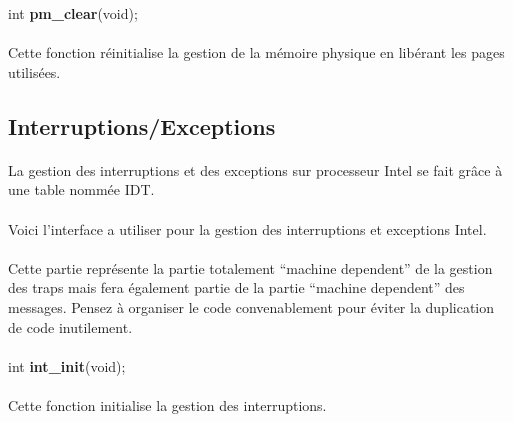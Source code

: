 \documentclass[10pt,a4wide]{article}
\begin{document}
\hspace{1.5cm}int \textbf{pm\_clear}(void);

\paragraph{}

Cette fonction r\'einitialise la gestion de la m\'emoire physique en lib\'erant
les pages utilis\'ees.

\subsection{Interruptions/Exceptions}

\paragraph{}

La gestion des interruptions et des exceptions sur processeur Intel se fait
gr\^ace \`a une table nomm\'ee IDT.

\paragraph{}

Voici l'interface a utiliser pour la gestion des interruptions et exceptions
Intel.

\paragraph{}

Cette partie repr\'esente la partie totalement ``machine dependent'' de la
gestion des traps mais fera \'egalement partie de la partie
``machine dependent'' des messages. Pensez \`a organiser le code convenablement
pour \'eviter la duplication de code inutilement.

\paragraph{}

\hspace{1.5cm}int \textbf{int\_init}(void);

\paragraph{}

Cette fonction initialise la gestion des interruptions.

\paragraph{}
\end{document}
